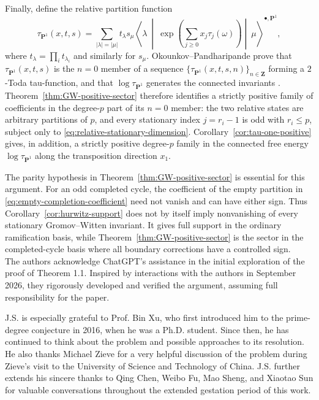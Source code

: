 \documentclass[11pt]{amsart}
\theoremstyle{plain}
\theoremstyle{definition}
\numberwithin{equation}{section}
\begin{document}
Finally, define the relative partition function
\begin{equation}\label{eq:relative-GW-partition-function}
 \tau_{\mathbf P^1}(x,t,s)
 =\sum_{|\lambda|=|\mu|}t_\lambda s_\mu
 \left\langle\lambda\ \middle|\
 \exp\!\left(\sum_{j\geq0}x_j\tau_j(\omega)\right)
 \middle|\ \mu\right\rangle^{\bullet,\mathbf P^1},
\end{equation}
where $t_\lambda=\prod_i t_{\lambda_i}$ and similarly for $s_\mu$.
Okounkov--Pandharipande prove that $\tau_{\mathbf P^1}(x,t,s)$ is the
$n=0$ member of a sequence
$\{\tau_{\mathbf P^1}(x,t,s,n)\}_{n\in\mathbf Z}$ forming a $2$-Toda
tau-function, and that $\log\tau_{\mathbf P^1}$ generates the connected invariants
\cite[Section~4, especially equations~(4.1)--(4.2) and Theorem~4]
{OkounkovPandharipande}.  Theorem~\ref{thm:GW-positive-sector} therefore
identifies a strictly positive family of coefficients in the degree-$p$
part of its $n=0$ member: the two relative states are
arbitrary partitions of $p$, and every stationary index $j=r_i-1$ is odd
with $r_i\leq p$, subject only to
\eqref{eq:relative-stationary-dimension}.  Corollary~\ref{cor:tau-one-positive}
gives, in addition, a strictly positive degree-$p$ family in the connected
free energy $\log\tau_{\mathbf P^1}$ along the transposition direction
$x_1$.

The parity hypothesis in Theorem~\ref{thm:GW-positive-sector} is essential
for this argument.  For an odd completed cycle, the coefficient of the
empty partition in \eqref{eq:empty-completion-coefficient} need not vanish
and can have either sign.  Thus Corollary~\ref{cor:hurwitz-support} does not
by itself imply nonvanishing of every stationary Gromov--Witten invariant.
It gives full support in the ordinary ramification basis, while
Theorem~\ref{thm:GW-positive-sector} is the sector in the completed-cycle
basis where all boundary corrections have a controlled sign.\\

The authors acknowledge ChatGPT's assistance in the initial exploration of the proof of Theorem
1.1. Inspired by interactions with the authors in September 2026, they rigorously developed and verified the
argument, assuming full responsibility for the paper.

J.S.  is especially grateful to Prof. Bin Xu, who first introduced him to the prime-degree conjecture in 2016, when he was a Ph.D. student. Since then, he has continued to think about the problem and possible approaches to its resolution. He also thanks Michael Zieve for a very helpful discussion of the problem during Zieve’s visit to the University of Science and Technology of China. J.S. further extends his sincere thanks to Qing Chen, Weibo Fu, Mao Sheng, and Xiaotao Sun for valuable conversations throughout the extended gestation period of this work.
\end{document}
